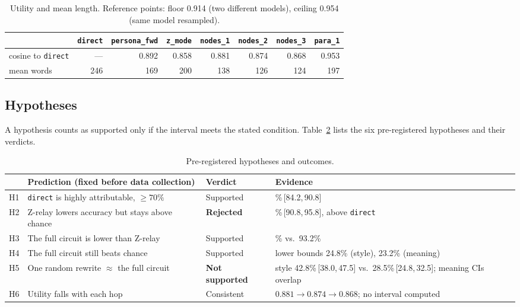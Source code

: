 \documentclass[11pt]{article}
\newcommand{\cond}[1]{\texttt{#1}}
\newcommand{\ci}[2]{\,[#1,\,#2]}
\begin{document}
\begin{table}[t]
\centering
\small
\begin{tabular}{@{}lrrrrrrr@{}}
\toprule
 & \cond{direct} & \cond{persona\_fwd} & \cond{z\_mode} & \cond{nodes\_1} & \cond{nodes\_2} & \cond{nodes\_3} & \cond{para\_1} \\
\midrule
cosine to \cond{direct} & --- & 0.892 & 0.858 & 0.881 & 0.874 & 0.868 & 0.953 \\
mean words & 246 & 169 & 200 & 138 & 126 & 124 & 197 \\
\bottomrule
\end{tabular}
\caption{Utility and mean length. Reference points: floor 0.914 (two different models), ceiling 0.954 (same model resampled).}
\label{tab:utility}
\end{table}

\subsection{Hypotheses}

A hypothesis counts as supported only if the interval meets the stated condition. Table~\ref{tab:hyp} lists the six pre-registered hypotheses and their verdicts.

\begin{table}[t]
\centering
\small
\begin{tabularx}{\linewidth}{@{}l >{\raggedright\arraybackslash}X l >{\raggedright\arraybackslash}X@{}}
\toprule
 & Prediction (fixed before data collection) & Verdict & Evidence \\
\midrule
H1 & \cond{direct} is highly attributable, $\geq 70\%$ & Supported & 87.5\%\ci{84.2}{90.8} \\
H2 & Z-relay lowers accuracy but stays above chance & \textbf{Rejected} & 93.2\%\ci{90.8}{95.8}, above \cond{direct} \\
H3 & The full circuit is lower than Z-relay & Supported & 28.5\% vs.\ 93.2\% \\
H4 & The full circuit still beats chance & Supported & lower bounds 24.8\% (style), 23.2\% (meaning) \\
H5 & One random rewrite $\approx$ the full circuit & \textbf{Not supported} & style 42.8\%\ci{38.0}{47.5} vs.\ 28.5\%\ci{24.8}{32.5}; meaning CIs overlap \\
H6 & Utility falls with each hop & Consistent & $0.881 \to 0.874 \to 0.868$; no interval computed \\
\bottomrule
\end{tabularx}
\caption{Pre-registered hypotheses and outcomes.}
\label{tab:hyp}
\end{table}
\end{document}
